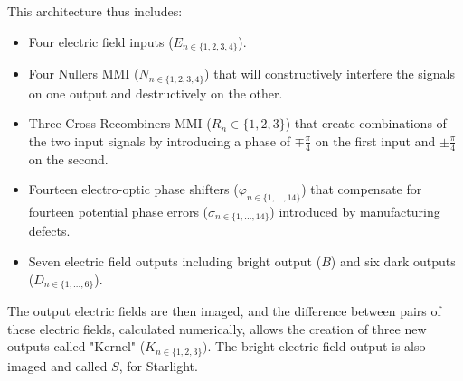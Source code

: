 \documentclass{aa}
\begin{document}
        This architecture thus includes:
    
        \begin{itemize}
            \item Four electric field inputs ($E_{n\in\{1,2,3,4\}}$).
            \item Four Nullers MMI ($N_{n\in\{1,2,3,4\}}$) that will constructively interfere the signals on one output and destructively on the other.
            \item Three Cross-Recombiners MMI ($R_n\in\{1,2,3\}$) that create combinations of the two input signals by introducing a phase of $\mp \frac \pi 4$ on the first input and $\pm \frac \pi 4$ on the second.
            \item Fourteen electro-optic phase shifters ($\varphi_{n\in\{1,...,14\}}$) that compensate for fourteen potential phase errors ($\sigma_{n\in\{1,...,14\}}$) introduced by manufacturing defects.
            \item Seven electric field outputs including bright output ($B$) and six dark outputs ($D_{n\in\{1,...,6\}}$).
        \end{itemize}
    
        The output electric fields are then imaged, and the difference between pairs of these electric fields, calculated numerically, allows the creation of three new outputs called "Kernel" ($K_{n\in\{1,2,3\}})$. The bright electric field output is also imaged and called $S$, for Starlight.
    
\end{document}
